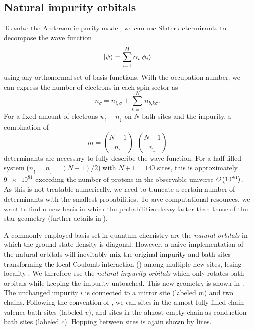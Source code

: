 \subsection{Natural impurity orbitals}
\label{sec:natural-impurity-orbitals}

To solve the Anderson impurity model,
we can use Slater determinants to decompose the wave function
\begin{equation}
    \lvert\psi\rangle = \sum_{i=1}^M \alpha_i \lvert\phi_i\rangle
\end{equation}
using any orthonormal set of basis functions.
With the occupation number,
we can express the number of electrons in each spin sector as
\begin{equation}
    n_\sigma = n_{i,\sigma} + \sum_{k=1}^N n_{b,k\sigma}.
\end{equation}
For a fixed amount of electrons $n_\uparrow + n_\downarrow$ on $N$ bath sites and the impurity,
a combination of
\begin{equation}
    m = \binom{N+1}{n_\uparrow} \cdot \binom{N+1}{n_\downarrow}
\end{equation}
determinants are necessary to fully describe the wave function.
For a half-filled system ($n_\uparrow = n_\downarrow = (N+1)/2$)
with $N+1=140$ sites, this is approximately $\num{9e81}$
exceeding the number of protons in the observable universe $O\!\left(\num{e80}\right)$. %
As this is not treatable numerically,
we need to truncate a certain number of determinants with the smallest probabilities.
To save computational resources,
we want to find a new basis in which the probabilities decay faster than those of the star geometry
(further details in \cite{Bi2019}).

A commonly employed basis set in quantum chemistry are the \emph{natural orbitals}
in which the ground state density is diagonal.
However,
a naive implementation of the natural orbitals will inevitably mix the original impurity
and bath sites transforming the local Coulomb interaction ()
among multiple new sites,
losing locality \cite{Lu2014,Lu2019}.
We therefore use the \emph{natural impurity orbitals}
which only rotates bath orbitals while keeping the impurity untouched.
This new geometry is shown in .
The unchanged impurity $i$ is connected to a mirror site (labeled $m$) and two chains.
Following the convention of \cite{Lu2014,Lu2019},
we call sites in the almost fully filled chain valence bath sites (labeled $v$),
and sites in the almost empty chain as conduction bath sites (labeled $c$).
Hopping between sites is again shown by lines.

